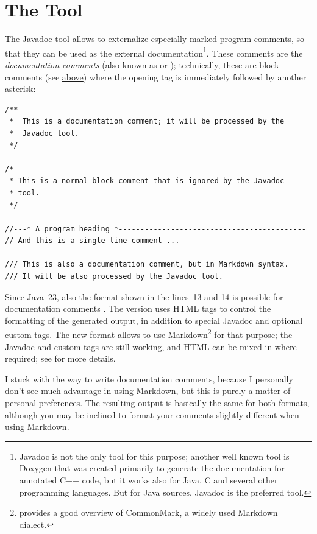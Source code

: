 \section{The  Tool}
The Javadoc tool allows to externalize especially marked program comments, so that they can be used as the external documentation\footnote{Javadoc is not the only tool for this purpose; another well known tool is Doxygen \autocite{DOXYGEN_HOMEPAGE} that was created primarily to generate the documentation for annotated \mbox{C++} code, but it works also for Java, C and several other programming languages. But for Java sources, Javadoc is the preferred tool.}. These comments are the \textit{documentation comments} (also known as  or ); technically, these are block comments (see \hyperref[sec:BlockComments]{above}) where the opening tag is immediately followed by another asterisk:
\begin{lstlisting}[firstnumber=1]
/**
 *  This is a documentation comment; it will be processed by the
 *  Javadoc tool.
 */

/*
 * This is a normal block comment that is ignored by the Javadoc
 * tool.
 */

//---* A program heading *------------------------------------------- 
// And this is a single-line comment ...

/// This is also a documentation comment, but in Markdown syntax.
/// It will be also processed by the Javadoc tool.
\end{lstlisting}

Since Java~23, also the format shown in the lines~13 and 14 is possible for documentation comments \autocite{JEP467}. The  version uses HTML tags to control the formatting of the generated output, in addition to special Javadoc and optional custom tags. The new format allows to use Markdown\footnote{\autocite{MacFarlane:CommonMarkSpec} provides a good overview of CommonMark, a widely used Markdown dialect.} for that purpose; the Javadoc and custom tags are still working, and HTML can be mixed in where required; see \autocite{ORACLE_DOC_JAVADOC_GUIDE:Markdown} for more details.

I stuck with the  way to write documentation comments, because I personally don't see much advantage in using Markdown, but this is purely a matter of personal preferences. The resulting output is basically the same for both formats, although you may be inclined to format your comments slightly different when using Markdown.

